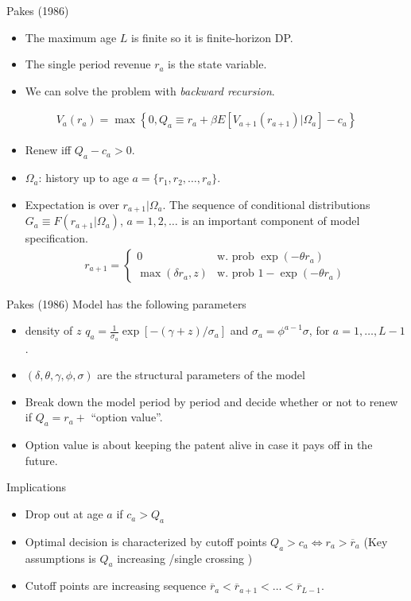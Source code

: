 \begin{frame}{Pakes (1986)}
\begin{itemize}
\item The maximum age $L$ is finite so it is finite-horizon DP.
\item The single period revenue $r_a$ is the state variable.
\item We can solve the problem with \textit{backward recursion}.
\end{itemize}
\begin{eqnarray*}
V_a(r_a) = \max  \left\{0, Q_a \equiv r_a + \beta E[V_{a+1} (r_{a+1} ) | \Omega_a] - c_a  \right\}
\end{eqnarray*}
\vspace{-0.75cm}
\begin{itemize}
\item Renew iff $Q_a - c_a > 0$.
\item $\Omega_a$: history up to age $a = \{r_1,r_2,\ldots,r_a\}$.
\item Expectation is over $r_{a+1} | \Omega_{a}$. The sequence of conditional distributions $G_a \equiv F(r_{a+1} | \Omega_a)$, $a=1,2,\ldots$ is an important component of model specification.
\begin{eqnarray*}
r_{a+1} = \begin{cases} 0  & \mbox{w. prob } \exp(-\theta r_a) \\
\max(\delta r_a,z) & \mbox{w. prob } 1-\exp(-\theta r_a) \end{cases}
\end{eqnarray*}
\end{itemize}
\end{frame}


\begin{frame}{Pakes (1986)}
Model has the following parameters
\begin{itemize}
\item density of $z$ $q_a = \frac{1}{\sigma_a} \exp[-(\gamma+z)/\sigma_a]$ and $\sigma_a = \phi^{a-1} \sigma$, for $a=1,\ldots,L-1$. 
\item $(\delta, \theta, \gamma, \phi, \sigma)$ are the structural parameters of the model
\item Break down the model period by period and decide whether or not to renew if $Q_a = r_a + $ ``option value''.
\item Option value is about keeping the patent alive in case it pays off in the future.
\end{itemize}
Implications
\begin{itemize}
\item Drop out at age $a$ if $c_a > Q_a$
\item Optimal decision is characterized by cutoff points $Q_a > c_a \Leftrightarrow r_a > \overline{r}_a$  (Key assumptions is $Q_a$ increasing /single crossing )
\item Cutoff points are increasing sequence $\overline{r}_{a} < \overline{r}_{a+1} < \ldots < \overline{r}_{L-1}$.
\end{itemize}
\end{frame}


